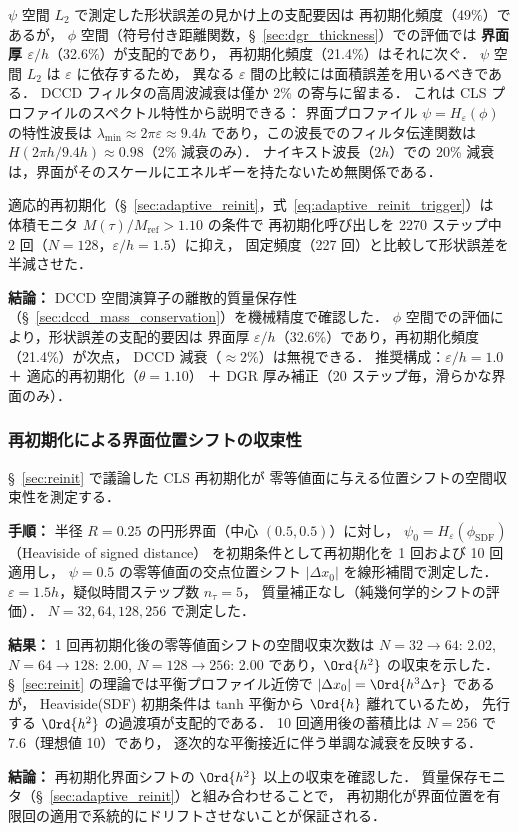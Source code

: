 $\psi$ 空間 $L_2$ で測定した形状誤差の見かけ上の支配要因は
再初期化頻度（49\%）であるが，
$\phi$ 空間（符号付き距離関数，§~\ref{sec:dgr_thickness}）での評価では
\textbf{界面厚 $\varepsilon/h$}（32.6\%）が支配的であり，
再初期化頻度（21.4\%）はそれに次ぐ．
$\psi$ 空間 $L_2$ は $\varepsilon$ に依存するため，
異なる $\varepsilon$ 間の比較には面積誤差を用いるべきである．
DCCD フィルタの高周波減衰は僅か 2\% の寄与に留まる．
これは CLS プロファイルのスペクトル特性から説明できる：
界面プロファイル $\psi = H_\varepsilon(\phi)$ の特性波長は
$\lambda_{\min} \approx 2\pi\varepsilon \approx 9.4h$
であり，この波長でのフィルタ伝達関数は $H(2\pi h / 9.4h) \approx 0.98$（2\% 減衰のみ）．
ナイキスト波長（$2h$）での 20\% 減衰は，界面がそのスケールにエネルギーを持たないため無関係である．

適応的再初期化（§~\ref{sec:adaptive_reinit}，式~\eqref{eq:adaptive_reinit_trigger}）は
体積モニタ $M(\tau)/M_{\mathrm{ref}} > 1.10$ の条件で
再初期化呼び出しを 2270 ステップ中 2 回（$N = 128$，$\varepsilon/h = 1.5$）に抑え，
固定頻度（227 回）と比較して形状誤差を半減させた．

\noindent\textbf{結論：}
DCCD 空間演算子の離散的質量保存性（§~\ref{sec:dccd_mass_conservation}）を機械精度で確認した．
$\phi$ 空間での評価により，形状誤差の支配的要因は
界面厚 $\varepsilon/h$（32.6\%）であり，再初期化頻度（21.4\%）が次点，
DCCD 減衰（$\approx 2\%$）は無視できる．
推奨構成：$\varepsilon/h = 1.0$ ＋ 適応的再初期化（$\theta = 1.10$）
＋ DGR 厚み補正（20 ステップ毎，滑らかな界面のみ）．

\subsubsection{再初期化による界面位置シフトの収束性}
\label{sec:verify_reinit_shift}

§~\ref{sec:reinit} で議論した CLS 再初期化が
零等値面に与える位置シフトの空間収束性を測定する．

\noindent\textbf{手順：}
半径 $R = 0.25$ の円形界面（中心 $(0.5, 0.5)$）に対し，
$\psi_0 = H_\varepsilon(\phi_{\mathrm{SDF}})$（Heaviside of signed distance）
を初期条件として再初期化を 1 回および 10 回適用し，
$\psi = 0.5$ の零等値面の交点位置シフト $|\Delta x_0|$ を線形補間で測定した．
$\varepsilon = 1.5h$，疑似時間ステップ数 $n_\tau = 5$，
質量補正なし（純幾何学的シフトの評価）．
$N = 32, 64, 128, 256$ で測定した．

\noindent\textbf{結果：}
1 回再初期化後の零等値面シフトの空間収束次数は
$N = 32 \to 64$: 2.02,
$N = 64 \to 128$: 2.00,
$N = 128 \to 256$: 2.00
であり，$\Ord{h^2}$ の収束を示した．
§~\ref{sec:reinit} の理論では平衡プロファイル近傍で
$|\Delta x_0| = \Ord{h^3 \Delta\tau}$ であるが，
Heaviside(SDF) 初期条件は tanh 平衡から $\Ord{h}$ 離れているため，
先行する $\Ord{h^2}$ の過渡項が支配的である．
10 回適用後の蓄積比は $N = 256$ で 7.6（理想値 10）であり，
逐次的な平衡接近に伴う単調な減衰を反映する．

\noindent\textbf{結論：}
再初期化界面シフトの $\Ord{h^2}$ 以上の収束を確認した．
質量保存モニタ（§~\ref{sec:adaptive_reinit}）と組み合わせることで，
再初期化が界面位置を有限回の適用で系統的にドリフトさせないことが保証される．
